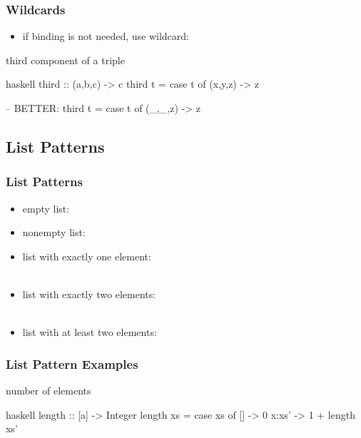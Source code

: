 \documentclass[dvipsnames]{beamer}
\theoremstyle{plain}
\begin{document}
\begin{frame}[fragile]
  \frametitle{Wildcards}

  \begin{itemize}
    \item if binding is not needed, use wildcard: 
  \end{itemize}

  \begin{exampleblock}{third component of a triple}
    \begin{pygments}{haskell}
third :: (a,b,c) -> c
third t =
    case t of
      (x,y,z) -> z

-- BETTER:
third t =
    case t of
      (_,_,z) -> z
    \end{pygments}
  \end{exampleblock}
\end{frame}

\subsection{List Patterns}

\begin{frame}[fragile]
  \frametitle{List Patterns}

  \begin{itemize}
    \item empty list:\\
    \item nonempty list:\\
    \item list with exactly one element:\\
      \\
    \item list with exactly two elements:\\
      \\
    \item list with at least two elements:\\
  \end{itemize}
\end{frame}

\begin{frame}[fragile]
  \frametitle{List Pattern Examples}

  \begin{exampleblock}{number of elements}
    \begin{pygments}{haskell}
length :: [a] -> Integer
length xs =
    case xs of
      []    -> 0
      x:xs' -> 1 + length xs'
    \end{pygments}
  \end{exampleblock}
\end{frame}
\end{document}
